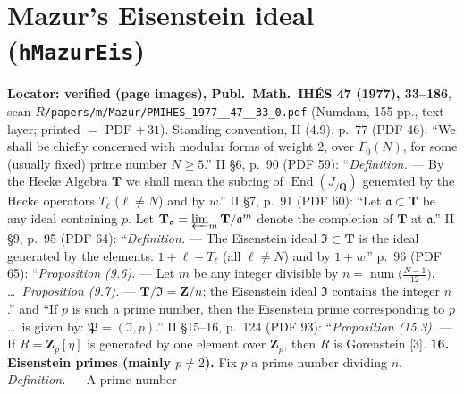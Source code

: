 \section{Mazur's Eisenstein ideal (\texttt{hMazurEis})}

\begin{hypothesis}\label{lit:hz-mazur-eis}
  \leanok
  \textbf{Locator: verified (page images), Publ.\ Math.\ IH\'ES 47 (1977), 33--186}, scan $R$\texttt{/papers/m/Mazur/PMIHES\_1977\_\_47\_\_33\_0.pdf}
  (Numdam, 155 pp., text layer; printed $=$ PDF $+\,31$). Standing convention, II (4.9), p.~77 (PDF 46): ``We shall be chiefly concerned with
  modular forms of weight 2, over $\Gamma_0(N)$, for some (usually fixed) prime number $N\ge5$.'' II \S6, p.~90 (PDF 59): ``\emph{Definition.} ---
  By the Hecke Algebra $\mathbf T$ we shall mean the subring of $\operatorname{End}(J_{/\mathbf Q})$ generated by the Hecke operators $T_\ell$
  ($\ell\ne N$) and by $w$.'' II \S7, p.~91 (PDF 60): ``Let $\mathfrak a\subset\mathbf T$ be any ideal containing $p$. Let
  $\mathbf T_{\mathfrak a}=\varprojlim_m\mathbf T/\mathfrak a^m$ denote the completion of $\mathbf T$ at $\mathfrak a$.'' II \S9, p.~95 (PDF 64): ``\emph{Definition.}
  --- The Eisenstein ideal $\mathfrak I\subset\mathbf T$ is the ideal generated by the elements: $1+\ell-T_\ell$ (all $\ell\ne N$) and by $1+w$.''
  p.~96 (PDF 65): ``\emph{Proposition (9.6).} --- Let $m$ be any integer divisible by $n=\operatorname{num}\bigl(\frac{N-1}{12}\bigr)$. \dots\
  \emph{Proposition (9.7).} --- $\mathbf T/\mathfrak I=\mathbf Z/n$; the Eisenstein ideal $\mathfrak I$ contains the integer $n$.'' and ``If $p$ is such a
  prime number, then the Eisenstein prime corresponding to $p$ \dots\ is given by: $\mathfrak P=(\mathfrak I,p)$.''
  II \S15--16, p.~124 (PDF 93): ``\emph{Proposition (15.3).} --- If $R=\mathbf Z_p[\eta]$ is generated by one element over $\mathbf Z_p$, then $R$ is
  Gorenstein [3]. \textbf{16. Eisenstein primes (mainly $p\ne2$).} Fix $p$ a prime number dividing $n$. \emph{Definition.} --- A prime number

\end{hypothesis}
